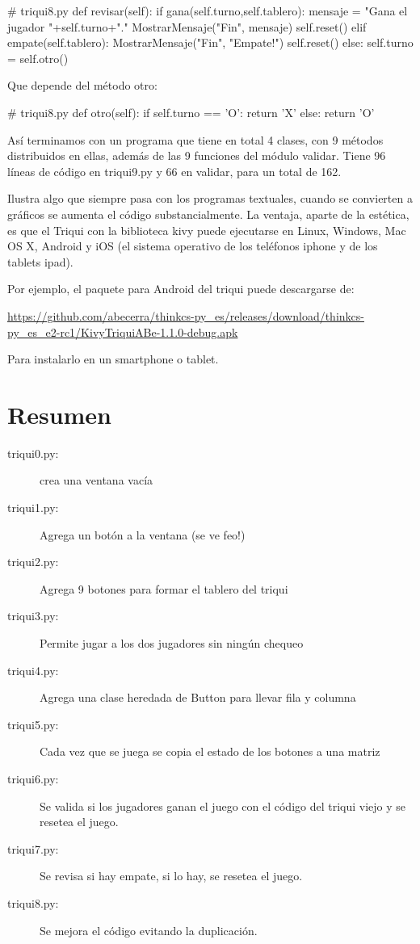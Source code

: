 \begin{pythoncode}
# triqui8.py
  def revisar(self):          
        if gana(self.turno,self.tablero):
            mensaje = "Gana el jugador "+self.turno+"."
            MostrarMensaje("Fin", mensaje)
            self.reset()
        elif empate(self.tablero):
            MostrarMensaje("Fin", "Empate!")
            self.reset()
        else:
            self.turno = self.otro()
\end{pythoncode}

Que depende del método otro:

\begin{pythoncode}
# triqui8.py
    def otro(self):
        if self.turno == 'O':
            return 'X'
        else:
            return 'O'
\end{pythoncode}

Así terminamos con un programa que tiene en total 4 clases, con 9
métodos distribuidos en ellas, además de las 9 funciones del módulo
validar. Tiene 96 líneas de código en triqui9.py y 66 en validar,
para un total de 162.

Ilustra algo que siempre pasa con los programas textuales, cuando
se convierten a gráficos se aumenta el código substancialmente. La
ventaja, aparte de la estética, es que el Triqui con la biblioteca
kivy puede ejecutarse en Linux, Windows, Mac OS X, Android y iOS (el
sistema operativo de los teléfonos iphone y de los tablets ipad).

Por ejemplo, el paquete para Android del triqui puede descargarse
de:

\url{https://github.com/abecerra/thinkcs-py_es/releases/download/thinkcs-py_es_e2-rc1/KivyTriquiABe-1.1.0-debug.apk}

Para instalarlo en un smartphone o tablet.

\section{Resumen}
\begin{description}
\item [{triqui0.py:}] crea una ventana vacía 
\item [{triqui1.py:}] Agrega un botón a la ventana (se ve feo!) 
\item [{triqui2.py:}] Agrega 9 botones para formar el tablero del triqui 
\item [{triqui3.py:}] Permite jugar a los dos jugadores sin ningún chequeo 
\item [{triqui4.py:}] Agrega una clase heredada de Button para llevar fila
y columna 
\item [{triqui5.py:}] Cada vez que se juega se copia el estado de los botones
a una matriz 
\item [{triqui6.py:}] Se valida si los jugadores ganan el juego con el
código del triqui viejo y se resetea el juego. 
\item [{triqui7.py:}] Se revisa si hay empate, si lo hay, se resetea el
juego. 
\item [{triqui8.py:}] Se mejora el código evitando la duplicación. 
\end{description}

